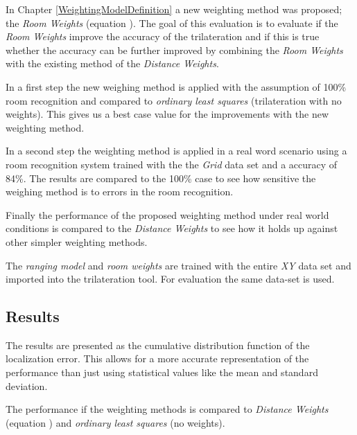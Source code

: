 In Chapter \ref{WeightingModelDefinition} a new weighting method was proposed; the \emph{Room Weights} (equation ). The goal of this evaluation is to evaluate if the \emph{Room Weights} improve the accuracy of the trilateration and if this is true whether the accuracy can be further improved by combining the \emph{Room Weights} with the existing method of the \emph{Distance Weights}.

In a first step the new weighing method is applied with the assumption of 100\% room recognition and compared to \emph{ordinary least squares} (trilateration with no weights). This gives us a best case value for the improvements with the new weighting method.

In a second step the weighting method is applied in a real word scenario using a room recognition system trained with the the \emph{Grid} data set and a accuracy of 84\%. The results are compared to the 100\% case to see how sensitive the weighing method is to errors in the room recognition.

Finally the performance of the proposed weighting method under real world conditions is compared to the \emph{Distance Weights} to see how it holds up against other simpler weighting methods.

The \emph{ranging model} and \emph{room weights} are trained with the entire \emph{XY} data set and imported into the trilateration tool. For evaluation the same data-set is used.

\subsection{Results}
The results are presented as the cumulative distribution function of the localization error. This allows for a more accurate representation of the performance than just using statistical values like the mean and standard deviation.

The performance if the weighting methods is compared to \emph{Distance Weights} (equation ) and \emph{ordinary least squares} (no weights).

